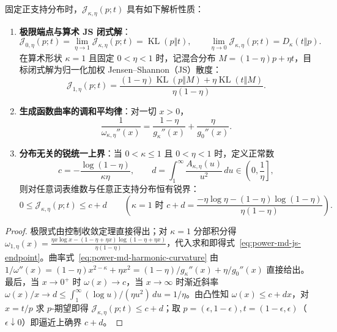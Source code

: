 \documentclass[lang=cn,scheme=chinese,openany]{elegantbook}
\newcommand{\KL}{\operatorname{KL}}
\begin{document}
\begin{theorem}
\label{thm:power-md-objective-endpoints}
\label{thm:power-md-uniform-cap}
固定正支持分布时，$\mathcal J_{\kappa,\eta}(p;t)$ 具有如下解析性质：
\begin{enumerate}
\item \textbf{极限端点与算术 JS 闭式解}：
\begin{equation}
 \mathcal J_{0,\eta}(p;t)=\lim_{\eta\to 1}\mathcal J_{\kappa,\eta}(p;t)=\KL(p\Vert t),\qquad
 \lim_{\eta\to 0}\mathcal J_{\kappa,\eta}(p;t)=D_\kappa(t\Vert p).
 \label{eq:power-md-objective-limits}
\end{equation}
在算术形状 $\kappa=1$ 且固定 $0<\eta<1$ 时，记混合分布 $M=(1-\eta)p+\eta t$，目标闭式解为归一化加权 Jensen--Shannon（JS）散度：
\begin{equation}
 \boxed{\mathcal J_{1,\eta}(p;t)
 =\frac{(1-\eta)\KL(p\Vert M)+\eta\KL(t\Vert M)}{\eta(1-\eta)}.}
 \label{eq:power-md-js-endpoint}
\end{equation}
\item \textbf{生成函数曲率的调和平均律}：对一切 $x>0$，
\begin{equation}
 \frac1{\omega_{\kappa,\eta}''(x)}
 =\frac{1-\eta}{g_\kappa''(x)}+\frac\eta{g_0''(x)}.
 \label{eq:power-md-harmonic-curvature}
\end{equation}
\item \textbf{分布无关的锐统一上界}：当 $0<\kappa\le 1$ 且 $0<\eta<1$ 时，定义正常数
\begin{equation}
 c=-\frac{\log(1-\eta)}{\kappa\eta},\qquad
 d=\int_1^\infty\frac{A_{\kappa,\eta}(u)}{u^2}\,du\in\left(0,\frac1\eta\right],
\end{equation}
则对任意词表维数与任意正支持分布恒有锐界：
\begin{equation}
 0\le\mathcal J_{\kappa,\eta}(p;t)\le c+d
 \qquad\left(\kappa=1\text{ 时 }c+d=\frac{-\eta\log\eta-(1-\eta)\log(1-\eta)}{\eta(1-\eta)}\right).
 \label{eq:power-md-uniform-cap}
\end{equation}
\end{enumerate}
\end{theorem}
\begin{proof}
极限式由控制收敛定理直接得出；对 $\kappa=1$ 分部积分得 $\omega_{1,\eta}(x)=\frac{\eta x\log x-(1-\eta+\eta x)\log(1-\eta+\eta x)}{\eta(1-\eta)}$，代入求和即得式~\eqref{eq:power-md-js-endpoint}。曲率式~\eqref{eq:power-md-harmonic-curvature} 由 $1/\omega''(x)=(1-\eta)x^{2-\kappa}+\eta x^2=(1-\eta)/g_\kappa''(x)+\eta/g_0''(x)$ 直接给出。最后，当 $x\to 0^+$ 时 $\omega(x)\to c$，当 $x\to\infty$ 时渐近斜率 $\omega(x)/x\to d\le\int_1^\infty(\log u)/(\eta u^2)\,du=1/\eta$。由凸性知 $\omega(x)\le c+dx$，对 $x=t/p$ 求 $p$-期望即得 $\mathcal J_{\kappa,\eta}(p;t)\le c+d$；取 $p=(\epsilon,1-\epsilon), t=(1-\epsilon,\epsilon)$（$\epsilon\downarrow 0$）即逼近上确界 $c+d$。
\end{proof}
\end{document}
